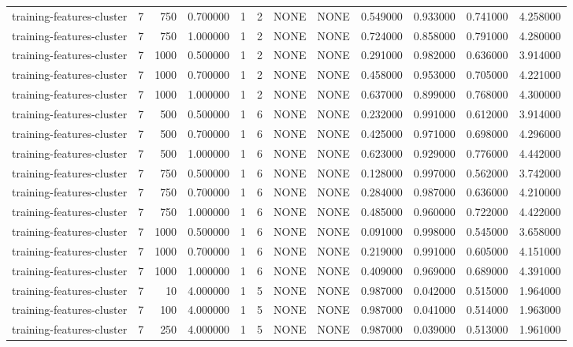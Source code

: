 \begin{tabular}{lrrrllllrrrr}
training-features-cluster & 7 & 750 & 0.700000 & 1 & 2 & NONE & NONE & 0.549000 & 0.933000 & 0.741000 & 4.258000 \\
training-features-cluster & 7 & 750 & 1.000000 & 1 & 2 & NONE & NONE & 0.724000 & 0.858000 & 0.791000 & 4.280000 \\
training-features-cluster & 7 & 1000 & 0.500000 & 1 & 2 & NONE & NONE & 0.291000 & 0.982000 & 0.636000 & 3.914000 \\
training-features-cluster & 7 & 1000 & 0.700000 & 1 & 2 & NONE & NONE & 0.458000 & 0.953000 & 0.705000 & 4.221000 \\
training-features-cluster & 7 & 1000 & 1.000000 & 1 & 2 & NONE & NONE & 0.637000 & 0.899000 & 0.768000 & 4.300000 \\
training-features-cluster & 7 & 500 & 0.500000 & 1 & 6 & NONE & NONE & 0.232000 & 0.991000 & 0.612000 & 3.914000 \\
training-features-cluster & 7 & 500 & 0.700000 & 1 & 6 & NONE & NONE & 0.425000 & 0.971000 & 0.698000 & 4.296000 \\
training-features-cluster & 7 & 500 & 1.000000 & 1 & 6 & NONE & NONE & 0.623000 & 0.929000 & 0.776000 & 4.442000 \\
training-features-cluster & 7 & 750 & 0.500000 & 1 & 6 & NONE & NONE & 0.128000 & 0.997000 & 0.562000 & 3.742000 \\
training-features-cluster & 7 & 750 & 0.700000 & 1 & 6 & NONE & NONE & 0.284000 & 0.987000 & 0.636000 & 4.210000 \\
training-features-cluster & 7 & 750 & 1.000000 & 1 & 6 & NONE & NONE & 0.485000 & 0.960000 & 0.722000 & 4.422000 \\
training-features-cluster & 7 & 1000 & 0.500000 & 1 & 6 & NONE & NONE & 0.091000 & 0.998000 & 0.545000 & 3.658000 \\
training-features-cluster & 7 & 1000 & 0.700000 & 1 & 6 & NONE & NONE & 0.219000 & 0.991000 & 0.605000 & 4.151000 \\
training-features-cluster & 7 & 1000 & 1.000000 & 1 & 6 & NONE & NONE & 0.409000 & 0.969000 & 0.689000 & 4.391000 \\
training-features-cluster & 7 & 10 & 4.000000 & 1 & 5 & NONE & NONE & 0.987000 & 0.042000 & 0.515000 & 1.964000 \\
training-features-cluster & 7 & 100 & 4.000000 & 1 & 5 & NONE & NONE & 0.987000 & 0.041000 & 0.514000 & 1.963000 \\
training-features-cluster & 7 & 250 & 4.000000 & 1 & 5 & NONE & NONE & 0.987000 & 0.039000 & 0.513000 & 1.961000 \\

\end{tabular}
